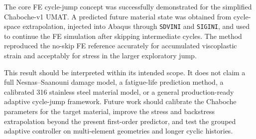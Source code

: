The core FE cycle-jump concept was successfully demonstrated for the simplified Chaboche-v1 UMAT. A predicted future material state was obtained from cycle-space extrapolation, injected into Abaqus through \texttt{SDVINI} and \texttt{SIGINI}, and used to continue the FE simulation after skipping intermediate cycles. The method reproduced the no-skip FE reference accurately for accumulated viscoplastic strain and acceptably for stress in the larger exploratory jump.

This result should be interpreted within its intended scope. It does not claim a full Nesnas--Saanouni damage model, a fatigue-life prediction method, a calibrated 316 stainless steel material model, or a general production-ready adaptive cycle-jump framework. Future work should calibrate the Chaboche parameters for the target material, improve the stress and backstress extrapolation beyond the present first-order predictor, and test the grouped adaptive controller on multi-element geometries and longer cyclic histories.
